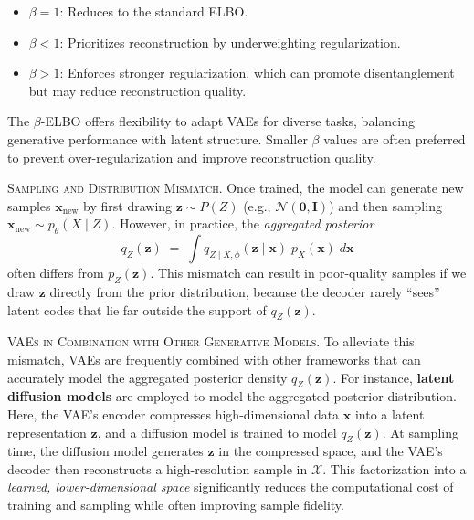 \begin{itemize}
    \item \(\beta = 1\): Reduces to the standard ELBO.
    \item \(\beta < 1\): Prioritizes reconstruction by underweighting regularization.
    \item \(\beta > 1\): Enforces stronger regularization, which can promote disentanglement but may reduce reconstruction quality.
\end{itemize}

The \(\beta\)-ELBO offers flexibility to adapt VAEs for diverse tasks, balancing generative performance with latent structure. Smaller \(\beta\) values are often preferred to prevent over-regularization and improve reconstruction quality.


\textsc{Sampling and Distribution Mismatch.} Once trained, the model can generate new samples \(\mathbf{x}_{\text{new}}\) by first drawing \(\mathbf{z} \sim P(Z)\) (e.g., \(\mathcal{N}(\mathbf{0}, \mathbf{I})\)) and then sampling \(\mathbf{x}_{\text{new}} \sim p_{\theta}(X \mid Z)\). However, in practice, the \emph{aggregated posterior}
\[
q_{Z}(\mathbf{z}) 
\;=\;
\int
q_{Z \mid X,\phi}(\mathbf{z}\mid \mathbf{x})
\;p_{X}(\mathbf{x})
\;d\mathbf{x}
\]
often differs from \(p_{Z}(\mathbf{z})\). This mismatch can result in poor-quality samples if we draw \(\mathbf{z}\) directly from the prior distribution, because the decoder rarely “sees” latent codes that lie far outside the support of \(q_{Z}(\mathbf{z})\).

\textsc{VAEs in Combination with Other Generative Models.} To alleviate this mismatch, VAEs are frequently combined with other frameworks that can accurately model the aggregated posterior density \(q_{Z}(\mathbf{z})\). For instance, \textbf{latent diffusion models} \cite{rombach2022high} are employed to model the aggregated posterior distribution. Here, the VAE’s encoder compresses high-dimensional data \(\mathbf{x}\) into a latent representation \(\mathbf{z}\), and a diffusion model is trained to model \(q_{Z}(\mathbf{z})\). At sampling time, the diffusion model generates \(\mathbf{z}\) in the compressed space, and the VAE’s decoder then reconstructs a high-resolution sample in \(\mathcal{X}\). This factorization into a \emph{learned, lower-dimensional space} significantly reduces the computational cost of training and sampling while often improving sample fidelity.

